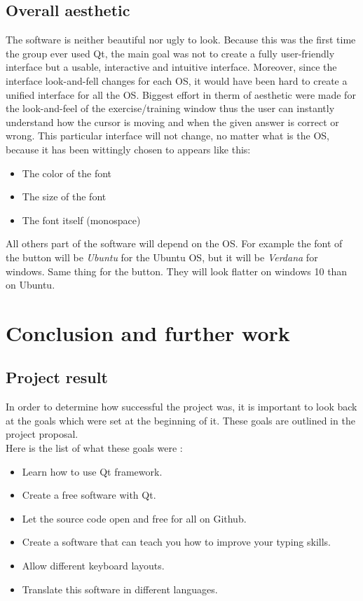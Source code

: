 \chapter{Overall aesthetic}
The software is neither beautiful nor ugly to look. Because this was the first time the group ever used Qt, the main goal was not to create a fully user-friendly interface but a usable, interactive and intuitive interface. Moreover, since the interface look-and-fell changes for each OS, it would have been hard to create a unified interface for all the OS. Biggest effort in therm of aesthetic were made for the look-and-feel of the exercise/training window thus the user can instantly understand how the cursor is moving and when the given answer is correct or wrong. This particular interface will not change, no matter what is the OS, because it has been wittingly chosen to appears like this:
\begin{itemize}
	\item The color of the font
	\item The size of the font
	\item The font itself (monospace)
\end{itemize}
All others part of the software will depend on the OS. For example the font of the button will be \textit{Ubuntu} for the Ubuntu OS, but it will be \textit{Verdana} for windows. Same thing for the button. They will look flatter on windows 10 than on Ubuntu.


\part{Conclusion and further work}
\chapter{Project result}
In order to determine how successful the project was, it is important to look back at the goals which were set at the beginning of it. These goals are outlined in the project proposal.\\
Here is the list of what these goals were :

\begin{itemize}
	\item Learn how to use Qt framework.
	\item Create a free software with Qt.
	\item Let the source code open and free for all on Github.
	\item Create a software that can teach you how to improve your typing skills.
	\item Allow different keyboard layouts.
	\item Translate this software in different languages.
\end{itemize}

